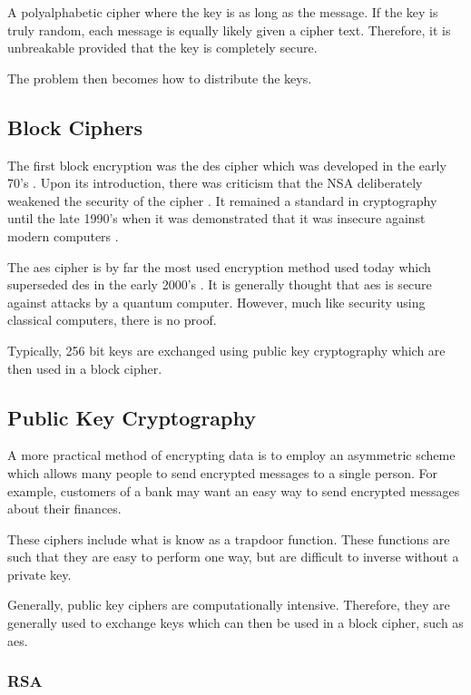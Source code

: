 A polyalphabetic cipher where the key is as long as the message. If the key is truly random, each message is equally likely given a cipher text. Therefore, it is unbreakable provided that the key is completely secure.

The problem then becomes how to distribute the keys.

\subsection{Block Ciphers}

The first block encryption was the \ac{des} cipher which was developed in the early 70's \cite{}. Upon its introduction, there was criticism that the NSA deliberately weakened the security of the cipher \cite{Diffie1977}. It remained a standard in cryptography until the late 1990's when it was demonstrated that it was insecure against modern computers \cite{}.

The \ac{aes} cipher is by far the most used encryption method used today which superseded \ac{des} in the early 2000's \cite{}. It is generally thought that \ac{aes} is secure against attacks by a quantum computer. However, much like security using classical computers, there is no proof.

Typically, 256 bit keys are exchanged using public key cryptography which are then used in a block cipher. 

\subsection{Public Key Cryptography}

A more practical method of encrypting data is to employ an asymmetric scheme which allows many people to send encrypted messages to a single person. For example, customers of a bank may want an easy way to send encrypted messages about their finances.

These ciphers include what is know as a {\color{bristol-red} trapdoor function}. These functions are such that they are easy to perform one way, but are difficult to inverse without a private key. 

Generally, public key ciphers are computationally intensive. Therefore, they are generally used to exchange keys which can then be used in a block cipher, such as \ac{aes}.

\subsubsection*{RSA}


